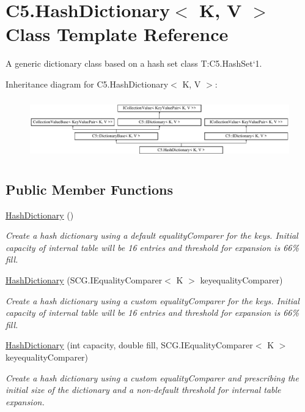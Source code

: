 \hypertarget{class_c5_1_1_hash_dictionary}{}\section{C5.\+Hash\+Dictionary$<$ K, V $>$ Class Template Reference}
\label{class_c5_1_1_hash_dictionary}


A generic dictionary class based on a hash set class T\+:\+C5.\+Hash\+Set`1.  


Inheritance diagram for C5.\+Hash\+Dictionary$<$ K, V $>$\+:\begin{figure}[H]
\begin{center}
\leavevmode
\includegraphics[height=2.629108cm]{class_c5_1_1_hash_dictionary}
\end{center}
\end{figure}
\subsection*{Public Member Functions}
\begin{DoxyCompactItemize}
\item 
\hyperlink{class_c5_1_1_hash_dictionary_a8cc5d148c92b62f69679cfdb20c14114}{Hash\+Dictionary} ()
\begin{DoxyCompactList}\small\item\em Create a hash dictionary using a default equality\+Comparer for the keys. Initial capacity of internal table will be 16 entries and threshold for expansion is 66\% fill. \end{DoxyCompactList}\item 
\hyperlink{class_c5_1_1_hash_dictionary_af4e45ac9fc7226b79a9cbf3d1d7014c4}{Hash\+Dictionary} (S\+C\+G.\+I\+Equality\+Comparer$<$ K $>$ keyequality\+Comparer)
\begin{DoxyCompactList}\small\item\em Create a hash dictionary using a custom equality\+Comparer for the keys. Initial capacity of internal table will be 16 entries and threshold for expansion is 66\% fill. \end{DoxyCompactList}\item 
\hyperlink{class_c5_1_1_hash_dictionary_a51e34dd05155273fc424ec3afbafedbe}{Hash\+Dictionary} (int capacity, double fill, S\+C\+G.\+I\+Equality\+Comparer$<$ K $>$ keyequality\+Comparer)
\begin{DoxyCompactList}\small\item\em Create a hash dictionary using a custom equality\+Comparer and prescribing the initial size of the dictionary and a non-\/default threshold for internal table expansion. \end{DoxyCompactList}\end{DoxyCompactItemize}
